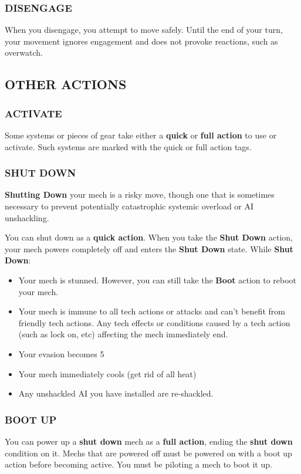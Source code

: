 \subsubsection{DISENGAGE}
When you disengage, you attempt to move safely. Until the end of your turn, your movement ignores engagement and does not provoke reactions, such as overwatch.

\subsection{OTHER ACTIONS}
\subsubsection{ACTIVATE}
Some systems or pieces of gear take either a \textbf{quick} or \textbf{full action} to use or activate. Such systems are marked with the quick or full action tags.

\subsubsection{SHUT DOWN}                                
\textbf{Shutting Down} your mech is a risky move, though one that is sometimes necessary to prevent potentially catastrophic systemic overload or AI unshackling. 

You can shut down as a \textbf{quick action}. When you take the \textbf{Shut Down} action, your mech powers completely off and enters the \textbf{Shut Down} state. While \textbf{Shut Down}:
\begin{itemize}
    \item Your mech is stunned. However, you can still take the \textbf{Boot} action to reboot your mech.
    \item Your mech is immune to all tech actions or attacks and can’t benefit from friendly tech actions. Any tech effects or conditions caused by a tech action (such as lock on, etc) affecting the mech immediately end.
    \item Your evasion becomes 5
    \item Your mech immediately cools (get rid of all heat)
    \item Any unshackled AI you have installed are re-shackled.
\end{itemize}


\subsubsection{BOOT UP}
You can power up a \textbf{shut down} mech as a \textbf{full action}, ending the \textbf{shut down} condition on it. Mechs that are powered off must be powered on with a boot up action before becoming active. You must be piloting a mech to boot it up.

